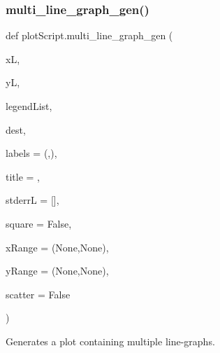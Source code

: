\subsubsection{\texorpdfstring{multi\_line\_graph\_gen()}{multi\_line\_graph\_gen()}}
{\footnotesize\ttfamily def plot\+Script.\+multi\+\_\+line\+\_\+graph\+\_\+gen (\begin{DoxyParamCaption}\item[{}]{xL,  }\item[{}]{yL,  }\item[{}]{legend\+List,  }\item[{}]{dest,  }\item[{}]{labels = {\ttfamily (\textquotesingle{}\textquotesingle{},\textquotesingle{}\textquotesingle{})},  }\item[{}]{title = {\ttfamily \textquotesingle{}\textquotesingle{}},  }\item[{}]{stderrL = {\ttfamily \mbox{[}\mbox{]}},  }\item[{}]{square = {\ttfamily False},  }\item[{}]{x\+Range = {\ttfamily (None,None)},  }\item[{}]{y\+Range = {\ttfamily (None,None)},  }\item[{}]{scatter = {\ttfamily False} }\end{DoxyParamCaption})}



Generates a plot containing multiple line-\/graphs. 


